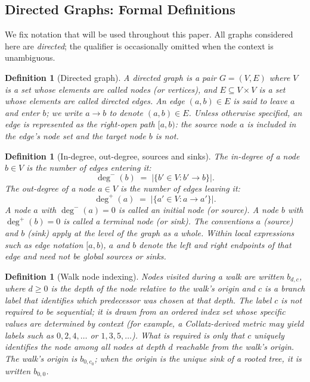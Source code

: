 \documentclass[11pt,a4paper]{article}
\newtheorem{definition}[theorem]{Definition}
\theoremstyle{remark}
\theoremstyle{plain}
\begin{document}
\subsection{Directed Graphs: Formal Definitions}

We fix notation that will be used throughout this paper.
All graphs considered here are \emph{directed}; the qualifier is occasionally omitted when
the context is unambiguous.

\begin{definition}[Directed graph]
A \emph{directed graph} is a pair $G = (V, E)$ where
$V$ is a set whose elements are called \emph{nodes} (or \emph{vertices}),
and $E \subseteq V \times V$ is a set whose elements are called \emph{directed edges}.
An edge $(a, b) \in E$ is said to \emph{leave} $a$ and \emph{enter} $b$;
we write $a \to b$ to denote $(a,b) \in E$.
Unless otherwise specified, an edge is represented as the right-open path $[a, b)$:
the source node $a$ is included in the edge's node set and the target node $b$ is not.
\end{definition}

\begin{definition}[In-degree, out-degree, sources and sinks]
The \emph{in-degree} of a node $b \in V$ is the number of edges entering it:
\[
  \deg^-(b) \;=\; \lvert\{b' \in V : b' \to b\}\rvert.
\]
The \emph{out-degree} of a node $a \in V$ is the number of edges leaving it:
\[
  \deg^+(a) \;=\; \lvert\{a' \in V : a \to a'\}\rvert.
\]
A node $a$ with $\deg^-(a) = 0$ is called an \emph{initial node} (or \emph{source}).
A node $b$ with $\deg^+(b) = 0$ is called a \emph{terminal node} (or \emph{sink}).
The conventions $a$ (source) and $b$ (sink) apply at the level of the graph as a whole.
Within local expressions such as edge notation $[a, b)$, $a$ and $b$ denote the
left and right endpoints of that edge and need not be global sources or sinks.
\end{definition}

\begin{definition}[Walk node indexing]
Nodes visited during a walk are written $b_{d,c}$, where $d \ge 0$ is the
\emph{depth} of the node relative to the walk's origin and $c$ is a
\emph{branch label} that identifies which predecessor was chosen at that depth.
The label $c$ is not required to be sequential; it is drawn from an ordered index set
whose specific values are determined by context (for example, a Collatz-derived
metric may yield labels such as $0, 2, 4, \ldots$ or $1, 3, 5, \ldots$).
What is required is only that $c$ uniquely identifies the node among all nodes at
depth $d$ reachable from the walk's origin.
The walk's origin is $b_{0,c_0}$; when the origin is the unique sink of a rooted
tree, it is written $b_{0,0}$.
\end{definition}
\end{document}
